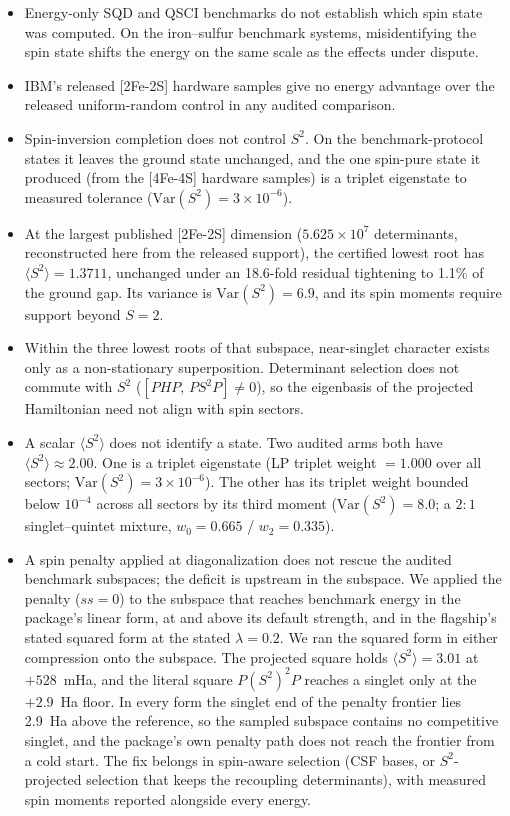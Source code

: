 \documentclass[11pt]{article}
\newcommand{\ssq}{\ensuremath{\langle S^2\rangle}}
\begin{document}
\begin{itemize}
\item Energy-only SQD and QSCI benchmarks do not establish which spin state was computed. On the iron--sulfur benchmark systems, misidentifying the spin state shifts the energy on the same scale as the effects under dispute.
\item IBM's released [2Fe-2S] hardware samples give no energy advantage over the released uniform-random control in any audited comparison.
\item Spin-inversion completion does not control $S^2$. On the benchmark-protocol states it leaves the ground state unchanged, and the one spin-pure state it produced (from the [4Fe-4S] hardware samples) is a triplet eigenstate to measured tolerance ($\mathrm{Var}(S^2) = 3\times10^{-6}$).
\item At the largest published [2Fe-2S] dimension ($5.625\times10^7$ determinants, reconstructed here from the released support), the certified lowest root has $\ssq = 1.3711$, unchanged under an 18.6-fold residual tightening to 1.1\% of the ground gap. Its variance is $\mathrm{Var}(S^2) = 6.9$, and its spin moments require support beyond $S = 2$.
\item Within the three lowest roots of that subspace, near-singlet character exists only as a non-stationary superposition. Determinant selection does not commute with $S^2$ ($[PHP,\, PS^2P] \neq 0$), so the eigenbasis of the projected Hamiltonian need not align with spin sectors.
\item A scalar \ssq{} does not identify a state. Two audited arms both have $\ssq \approx 2.00$. One is a triplet eigenstate (LP triplet weight $=1.000$ over all sectors; $\mathrm{Var}(S^2) = 3\times10^{-6}$). The other has its triplet weight bounded below $10^{-4}$ across all sectors by its third moment ($\mathrm{Var}(S^2) = 8.0$; a $2{:}1$ singlet--quintet mixture, $w_0 = 0.665$ / $w_2 = 0.335$).
\item A spin penalty applied at diagonalization does not rescue the audited benchmark subspaces; the deficit is upstream in the subspace. We applied the penalty ($ss = 0$) to the subspace that reaches benchmark energy in the package's linear form, at and above its default strength, and in the flagship's stated squared form at the stated $\lambda = 0.2$. We ran the squared form in either compression onto the subspace. The projected square holds $\ssq = 3.01$ at $+528$~mHa, and the literal square $P(S^2)^2P$ reaches a singlet only at the $+2.9$~Ha floor. In every form the singlet end of the penalty frontier lies 2.9~Ha above the reference, so the sampled subspace contains no competitive singlet, and the package's own penalty path does not reach the frontier from a cold start. The fix belongs in spin-aware selection (CSF bases, or $S^2$-projected selection that keeps the recoupling determinants), with measured spin moments reported alongside every energy.
\end{itemize}
\end{document}
